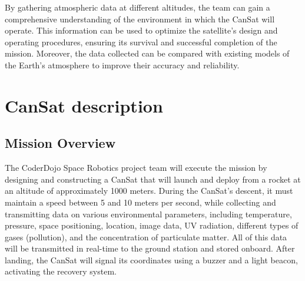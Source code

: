 \documentclass[11pt]{article}
\begin{document}
By gathering atmospheric data at different altitudes, the team can gain a comprehensive understanding of the environment in which the CanSat will operate. This information can be used to optimize the satellite's design and operating procedures, ensuring its survival and successful completion of the mission. Moreover, the data collected can be compared with existing models of the Earth's atmosphere to improve their accuracy and reliability.

\section{CanSat description}

\subsection{Mission Overview}

The CoderDojo Space Robotics project team will execute the mission by designing and constructing a CanSat that will launch and deploy from a rocket at an altitude of approximately 1000 meters. During the CanSat's descent, it must maintain a speed between 5 and 10 meters per second, while collecting and transmitting data on various environmental parameters, including temperature, pressure, space positioning, location, image data, UV radiation, different types of gases (pollution), and the concentration of particulate matter. All of this data will be transmitted in real-time to the ground station and stored onboard. After landing, the CanSat will signal its coordinates using a buzzer and a light beacon, activating the recovery system.
\end{document}
